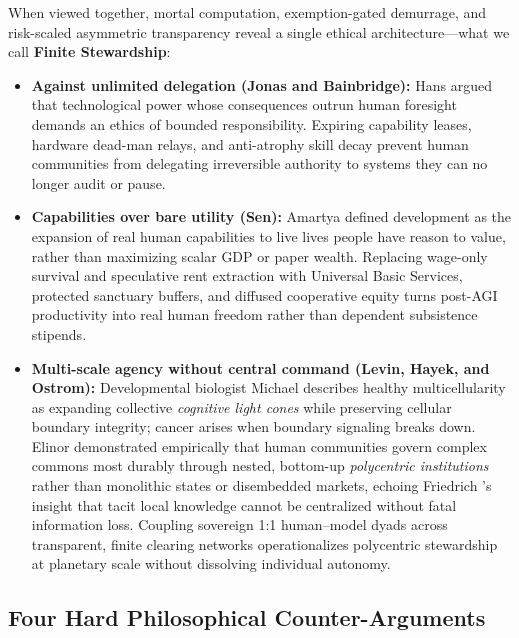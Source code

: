 \documentclass[11pt]{article}
\begin{document}
When viewed together, mortal computation, exemption-gated demurrage, and risk-scaled asymmetric transparency reveal a single ethical architecture---what we call \textbf{Finite Stewardship}:
\begin{itemize}
  \item \textbf{Against unlimited delegation (Jonas and Bainbridge):} Hans \citet{jonas1984responsibility} argued that technological power whose consequences outrun human foresight demands an ethics of bounded responsibility. Expiring capability leases, hardware dead-man relays, and anti-atrophy skill decay prevent human communities from delegating irreversible authority to systems they can no longer audit or pause.
  \item \textbf{Capabilities over bare utility (Sen):} Amartya \citet{sen1999development} defined development as the expansion of real human capabilities to live lives people have reason to value, rather than maximizing scalar GDP or paper wealth. Replacing wage-only survival and speculative rent extraction with Universal Basic Services, protected sanctuary buffers, and diffused cooperative equity turns post-AGI productivity into real human freedom rather than dependent subsistence stipends.
  \item \textbf{Multi-scale agency without central command (Levin, Hayek, and Ostrom):} Developmental biologist Michael \citet{levin2019computational} describes healthy multicellularity as expanding collective \emph{cognitive light cones} while preserving cellular boundary integrity; cancer arises when boundary signaling breaks down. Elinor \citet{ostrom1990governing, ostrom2010beyond} demonstrated empirically that human communities govern complex commons most durably through nested, bottom-up \emph{polycentric institutions} rather than monolithic states or disembedded markets, echoing Friedrich \citet{hayek1945knowledge}'s insight that tacit local knowledge cannot be centralized without fatal information loss. Coupling sovereign 1:1 human--model dyads across transparent, finite clearing networks operationalizes polycentric stewardship at planetary scale without dissolving individual autonomy.
\end{itemize}

\subsection{Four Hard Philosophical Counter-Arguments}
\end{document}

